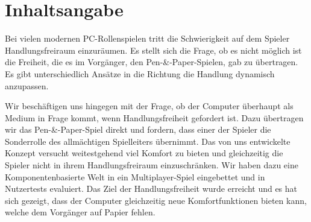 \chapter*{Inhaltsangabe}

Bei vielen modernen PC-Rollenspielen tritt die Schwierigkeit auf dem Spieler Handlungsfreiraum einzuräumen. Es stellt sich die Frage, ob es nicht möglich ist die Freiheit, die es im Vorgänger, den Pen-\&-Paper-Spielen, gab zu übertragen. Es gibt unterschiedlich Ansätze in die Richtung die Handlung dynamisch anzupassen.

Wir beschäftigen uns hingegen mit der Frage, ob der Computer überhaupt als Medium in Frage kommt, wenn Handlungsfreiheit gefordert ist. Dazu übertragen wir das Pen-\&-Paper-Spiel direkt und fordern, dass einer der Spieler die Sonderrolle des allmächtigen Spielleiters übernimmt. Das von uns entwickelte Konzept versucht weitestgehend viel Komfort zu bieten und gleichzeitig die Spieler nicht in ihrem Handlungsfreiraum einzuschränken. Wir haben dazu eine Komponentenbasierte Welt in ein Multiplayer-Spiel eingebettet und in Nutzertests evaluiert. Das Ziel der Handlungsfreiheit wurde erreicht und es hat sich gezeigt, dass der Computer gleichzeitig neue Komfortfunktionen bieten kann, welche dem Vorgänger auf Papier fehlen.